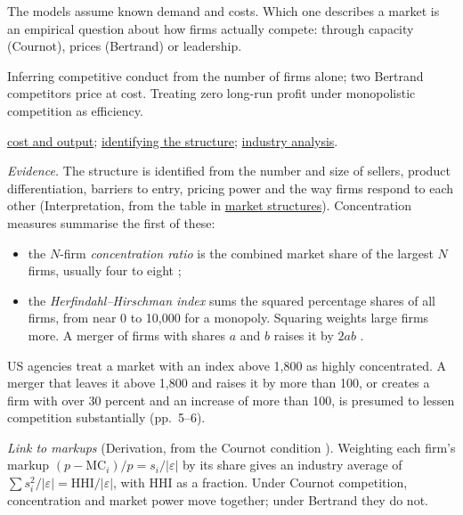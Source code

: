 \begin{qfdefinition}
 The models assume known demand and costs. Which one describes a market is an empirical question about how firms actually compete: through capacity (Cournot), prices (Bertrand) or leadership.

 Inferring competitive conduct from the number of firms alone; two Bertrand competitors price at cost. Treating zero long-run profit under monopolistic competition as efficiency.

 \hyperref[meth:cost-output-shutdown]{cost and output}; \hyperref[meth:market-structure-identification]{identifying the structure}; \hyperref[meth:industry-analysis]{industry analysis}.

\end{qfdefinition}

\begin{qfmethod}\label{meth:market-structure-identification}
 \emph{Evidence.} The structure is identified from the number and size of sellers, product differentiation, barriers to entry, pricing power and the way firms respond to each other (Interpretation, from the table in \hyperref[def:market-structures-pricing]{market structures}). Concentration measures summarise the first of these:
\begin{itemize}
\item the $N$-firm \emph{concentration ratio} is the combined market share of the largest $N$ firms, usually four to eight \citep[sec.~11.1]{openstax-microeconomics-3e};
\item the \emph{Herfindahl--Hirschman index} sums the squared percentage shares of all firms, from near 0 to 10,000 for a monopoly. Squaring weights large firms more. A merger of firms with shares $a$ and $b$ raises it by $2ab$ \citep[pp.~5--6, n.~14]{merger-guidelines-2023}.
\end{itemize}
US agencies treat a market with an index above 1,800 as highly concentrated. A merger that leaves it above 1,800 and raises it by more than 100, or creates a firm with over 30 percent and an increase of more than 100, is presumed to lessen competition substantially (pp.~5--6).

\emph{Link to markups} (Derivation, from the Cournot condition \citep[pp.~529--530]{varian-microeconomics-2014}). Weighting each firm's markup $(p-\mathrm{MC}_i)/p=s_i/|\varepsilon|$ by its share gives an industry average of $\sum s_i^2/|\varepsilon|=\mathrm{HHI}/|\varepsilon|$, with HHI as a fraction. Under Cournot competition, concentration and market power move together; under Bertrand they do not.


\end{qfmethod}
